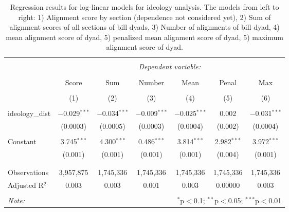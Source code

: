 
\begin{table}[!htbp] \centering 
  \caption{Regression results for log-linear models for ideology
analysis. The models from left to right: 1) Alignment score
by section (dependence not considered yet),
2) Sum of alignment scores of all sections of
bill dyads, 3) Number of alignments of bill dyad, 4)
mean alignment score of dyad, 5) penalized mean alignment
score of dyad, 5) maximum alignment score of dyad. } 
  \label{tab:ideo_reg} 
\begin{tabular}{@{\extracolsep{5pt}}lcccccc} 
\\[-1.8ex]\hline 
\hline \\[-1.8ex] 
 & \multicolumn{6}{c}{\textit{Dependent variable:}} \\ 
\cline{2-7} 
\\[-1.8ex] & Score & Sum & Number & Mean & Penal & Max \\ 
\\[-1.8ex] & (1) & (2) & (3) & (4) & (5) & (6)\\ 
\hline \\[-1.8ex] 
 ideology\_dist & $-$0.029$^{***}$ & $-$0.034$^{***}$ & $-$0.009$^{***}$ & $-$0.025$^{***}$ & 0.002 & $-$0.031$^{***}$ \\ 
  & (0.0003) & (0.0005) & (0.0003) & (0.0004) & (0.002) & (0.0004) \\ 
  & & & & & & \\ 
 Constant & 3.745$^{***}$ & 4.300$^{***}$ & 0.486$^{***}$ & 3.814$^{***}$ & 2.982$^{***}$ & 3.972$^{***}$ \\ 
  & (0.001) & (0.001) & (0.001) & (0.001) & (0.004) & (0.001) \\ 
  & & & & & & \\ 
\hline \\[-1.8ex] 
Observations & 3,957,875 & 1,745,336 & 1,745,336 & 1,745,336 & 1,745,336 & 1,745,336 \\ 
Adjusted R$^{2}$ & 0.003 & 0.003 & 0.001 & 0.003 & 0.00000 & 0.003 \\ 
\hline 
\hline \\[-1.8ex] 
\textit{Note:}  & \multicolumn{6}{r}{$^{*}$p$<$0.1; $^{**}$p$<$0.05; $^{***}$p$<$0.01} \\ 
\end{tabular} 
\end{table} 
